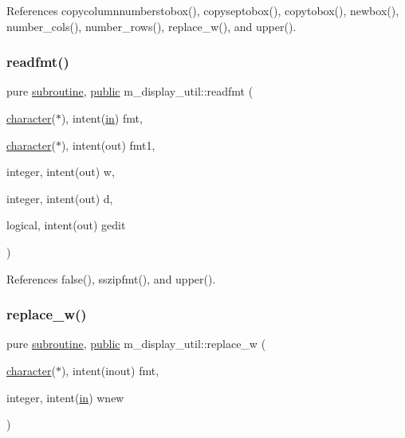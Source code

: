References copycolumnnumberstobox(), copyseptobox(), copytobox(), newbox(), number\+\_\+cols(), number\+\_\+rows(), replace\+\_\+w(), and upper().

\mbox{\label{namespacem__display__util_a73ae4e30d2dcf1f608ac24bf1623ee6c}} 
\subsubsection{\texorpdfstring{readfmt()}{readfmt()}}
{\footnotesize\ttfamily pure \hyperlink{M__stopwatch_83_8txt_acfbcff50169d691ff02d4a123ed70482}{subroutine}, \hyperlink{M__stopwatch_83_8txt_a2f74811300c361e53b430611a7d1769f}{public} m\+\_\+display\+\_\+util\+::readfmt (\begin{DoxyParamCaption}\item[{\hyperlink{option__stopwatch_83_8txt_abd4b21fbbd175834027b5224bfe97e66}{character}($\ast$), intent(\hyperlink{M__journal_83_8txt_afce72651d1eed785a2132bee863b2f38}{in})}]{fmt,  }\item[{\hyperlink{option__stopwatch_83_8txt_abd4b21fbbd175834027b5224bfe97e66}{character}($\ast$), intent(out)}]{fmt1,  }\item[{integer, intent(out)}]{w,  }\item[{integer, intent(out)}]{d,  }\item[{logical, intent(out)}]{gedit }\end{DoxyParamCaption})}



References false(), sszipfmt(), and upper().

\mbox{\label{namespacem__display__util_a76a458454b83026c12d4a90882f2719e}} 
\subsubsection{\texorpdfstring{replace\+\_\+w()}{replace\_w()}}
{\footnotesize\ttfamily pure \hyperlink{M__stopwatch_83_8txt_acfbcff50169d691ff02d4a123ed70482}{subroutine}, \hyperlink{M__stopwatch_83_8txt_a2f74811300c361e53b430611a7d1769f}{public} m\+\_\+display\+\_\+util\+::replace\+\_\+w (\begin{DoxyParamCaption}\item[{\hyperlink{option__stopwatch_83_8txt_abd4b21fbbd175834027b5224bfe97e66}{character}($\ast$), intent(inout)}]{fmt,  }\item[{integer, intent(\hyperlink{M__journal_83_8txt_afce72651d1eed785a2132bee863b2f38}{in})}]{wnew }\end{DoxyParamCaption})}

